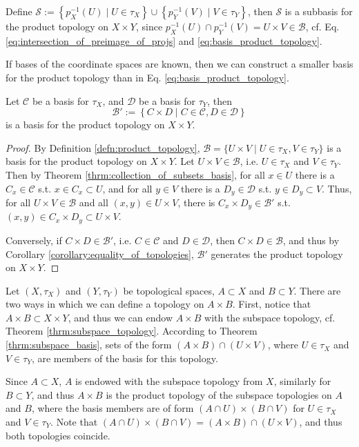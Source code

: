 \begin{remark}
	Define $\mathscr S := \left\{ p_X^{-1}(U) \mid U\in\tau_X \right\} \cup \left\{ p_Y^{-1}(V) \mid V\in\tau_Y \right\}$, then $\mathscr S$ is a subbasis for the product topology on $X\times Y$, since $p_X^{-1}(U) \cap p_Y^{-1}(V) = U\times V\in \mathscr B$, cf. Eq. \eqref{eq:intersection_of_preimage_of_projs} and \eqref{eq:basis_product_topology}.
\end{remark}

If bases of the coordinate spaces are known, then we can construct a smaller basis for the product topology than in Eq. \eqref{eq:basis_product_topology}.

\begin{theorem}\label{thrm:basis_product_topology_coarser}
	Let $\mathscr C$ be a basis for $\tau_X$, and $\mathscr D$ be a basis for $\tau_Y$, then
	$$\mathscr B' := \left\{C\times D \mid C\in \mathscr C, D\in \mathscr D\right\}$$
	is a basis for the product topology on $X\times Y$.
\end{theorem}

\begin{proof}
	By Definition \ref{defn:product_topology}, $\mathscr B = \{ U\times V \mid U\in\tau_X, V\in\tau_Y \}$ is a basis for the product topology on $X\times Y$. Let $U\times V\in \mathscr B$, i.e. $U\in\tau_X$ and $V\in\tau_Y$. Then by Theorem \ref{thrm:collection_of_subsets_basis}, for all $x\in U$ there is a $C_x\in \mathscr C$ s.t. $x\in C_x\subset U$, and for all $y\in V$ there is a $D_y\in\mathscr D$ s.t. $y\in D_y\subset V$. Thus, for all $U\times V\in \mathscr B$ and all $(x, y)\in U\times V$, there is $C_x\times D_y\in \mathscr B'$ s.t. $(x, y)\in C_x\times D_y\subset U\times V$.
	
	Conversely, if $C\times D\in \mathscr B'$, i.e. $C\in\mathscr C$ and $D\in\mathscr D$, then $C\times D\in\mathscr B$, and thus by Corollary \ref{corollary:equality_of_topologies}, $\mathscr B'$ generates the product topology on $X\times Y$.
\end{proof}

\begin{remark}
	Let $(X, \tau_X)$ and $(Y, \tau_Y)$ be topological spaces, $A\subset X$ and $B\subset Y$. There are two ways in which we can define a topology on $A\times B$. First, notice that $A\times B\subset X\times Y$, and thus we can endow $A\times B$ with the subspace topology, cf. Theorem \ref{thrm:subspace_topology}. According to Theorem \ref{thrm:subspace_basis}, sets of the form $(A\times B) \cap (U\times V)$, where $U\in\tau_X$ and $V\in\tau_Y$, are members of the basis for this topology.
	
	Since $A\subset X$, $A$ is endowed with the subspace topology from $X$, similarly for $B\subset Y$, and thus $A\times B$ is the product topology of the subspace topologies on $A$ and $B$, where the basis members are of form $(A\cap U)\times (B\cap V)$ for $U\in\tau_X$ and $V\in\tau_Y$. Note that $(A\cap U)\times (B\cap V) = (A\times B)\cap (U\times V)$, and thus both topologies coincide.
\end{remark}

